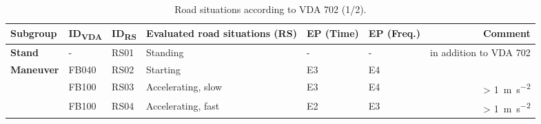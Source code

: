 \begin{table}[!h]
    \caption{Road situations according to VDA 702 (1/2).}
    \label{tab: road situations VDA 702}%
    \vspace*{1em}
    \begin{adjustbox}{max width=\textwidth}
        \begin{tabular}{l|l|l|p{16.59em}|l|l|r}
            {\textbf{Subgroup}}                          & \textbf{ID\textsubscript{VDA}}                & \textbf{ID\textsubscript{RS}}            & \textbf{Evaluated road situations (RS)}                                               & \textbf{EP (Time)}                     & \textbf{EP (Freq.)}                    & \multicolumn{1}{p{9.955em}|}{\textbf{Comment}}                                                             \\
            \midrule
            \multicolumn{1}{p{7.455em}|}{\textbf{Stand}} & \cellcolor[rgb]{ .851,  .851,  .851}-         & \cellcolor[rgb]{ .851,  .851,  .851}RS01 & \cellcolor[rgb]{ .851,  .851,  .851}Standing                                          & \cellcolor[rgb]{ .851,  .851,  .851}-  & \cellcolor[rgb]{ .851,  .851,  .851}-  & \multicolumn{1}{p{9.955em}|}{\cellcolor[rgb]{ .851,  .851,  .851}in addition to VDA 702}                   \\
            \multicolumn{1}{l|}{\textbf{Maneuver}}       & FB040                                         & RS02                                     & Starting                                                                              & E3                                     & E4                                     &                                                                                                            \\
            \cmidrule{2-7}                               & \cellcolor[rgb]{ .851,  .851,  .851}FB100     & \cellcolor[rgb]{ .851,  .851,  .851}RS03 & \cellcolor[rgb]{ .851,  .851,  .851}Accelerating, slow                                & \cellcolor[rgb]{ .851,  .851,  .851}E3 & \cellcolor[rgb]{ .851,  .851,  .851}E4 & \multicolumn{1}{p{9.955em}|}{\cellcolor[rgb]{ .851,  .851,  .851} > \SI{1}{\metre\per\second\squared}}     \\
            \cmidrule{2-7}                               & FB100                                         & RS04                                     & Accelerating, fast                                                                    & E2                                     & E3                                     & \multicolumn{1}{p{9.955em}|}{ > \SI{1}{\metre\per\second\squared}}                                         \\

\end{tabular}
\end{adjustbox}
\end{table}
